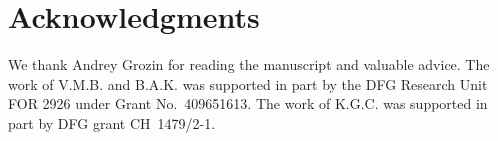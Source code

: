 \documentclass[12pt]{article}
\numberwithin{equation}{section}
\newcommand{\1}[1]{\mathbf{1}^{#1}}
\newcommand{\2}[1]{\mathbf{2}^{#1}}
\newcommand{\3}[1]{\mathbf{3}^{#1}}
\newcommand{\4}[1]{\mathbf{4}^{#1}}
\newcommand{\5}[1]{\mathbf{5}^{#1}}
\newcommand{\vv}{v^2}
\begin{document}
%



\section*{Acknowledgments}

We thank Andrey Grozin for reading  the  manuscript and  valuable advice. 
The work of V.M.B. and B.A.K. was supported in part by the DFG 
Research Unit FOR 2926 under Grant No.\ 409651613.
The work of K.G.C. was supported in part by DFG grant CH~1479/2-1. 
%
\appendix
\end{document}
